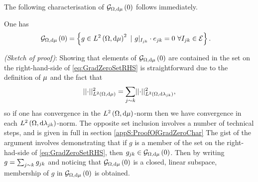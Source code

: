 The following characterisation of $\mathcal{G}_{ \Omega, \mathrm{d}\mu}\left( 0 \right)$ follows immediately.
\begin{prop} \label{prop:GradZeroGraph}
	One has
	\begin{align} \label{eq:GradZeroSetRHS}
		\mathcal{G}_{ \Omega, \mathrm{d}\mu}\left( 0 \right) &= \left\{ g\in L^{2}\left( \Omega,\mathrm{d}\mu \right)^2 \ \vert \ g\vert_{I_{jk}}\cdot e_{jk}=0 \ \forall I_{jk}\in \mathcal{E} \right\}. 
	\end{align}
\end{prop}
\textit{(Sketch of proof)}:
	Showing that elements of $\mathcal{G}_{ \Omega, \mathrm{d}\mu}\left( 0 \right)$ are contained in the set on the right-hand-side of \eqref{eq:GradZeroSetRHS} is straightforward due to the definition of $\mu$ and the fact that
	\begin{align} \label{eq:GraphMeasNormEdgeBreakdown}
		\lvert\lvert \cdot \rvert\rvert_{L^{2}\left( \Omega,\mathrm{d}\mu \right)}^2 = \sum_{j\sim k}\lvert\lvert \cdot \rvert\rvert_{L^{2}\left( \Omega,\mathrm{d}\lambda_{jk} \right)}^2,
	\end{align}
	so if one has convergence in the $L^{2}\left( \Omega,\mathrm{d}\mu \right)$-norm then we have convergence in each $L^{2}\left( \Omega,\mathrm{d}\lambda_{jk} \right)$-norm.
	The opposite set inclusion involves a number of technical steps, and is given in full in section \ref{appS:ProofOfGradZeroChar}
	The gist of the argument involves demonstrating that if $g$ is a member of the set on the right-had-side of \eqref{eq:GradZeroSetRHS}, then $g_{jk}\in\mathcal{G}_{ \Omega, \mathrm{d}\mu}\left( 0 \right)$.
	Then by writing $g = \sum_{j\sim k} g_{jk}$ and noticing that $\mathcal{G}_{ \Omega, \mathrm{d}\mu}\left( 0 \right)$ is a closed, linear subspace, membership of $g$ in $\mathcal{G}_{ \Omega, \mathrm{d}\mu}\left( 0 \right)$ is obtained.

